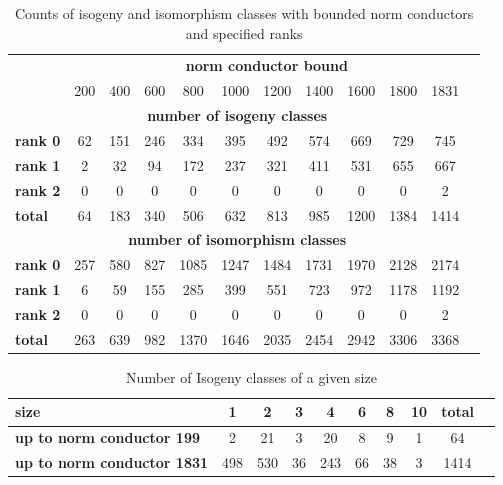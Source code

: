 \documentclass{amsart}
\begin{document}
\begin{center}
\begin{table}[h]
\caption{Counts of isogeny and isomorphism classes with bounded norm conductors and specified ranks\label{table:increasing-counts}}
\begin{tabular}{l|c|c|c|c|c|c|c|c|c|c|c|} \cline{2-11}
&\multicolumn{10}{|c|}{\textbf{norm conductor bound}} \\\cline{2-11}
& 200 & 400 & 600 & 800 & 1000 & 1200 & 1400 & 1600 & 1800 & 1831\\\hline\hline
\multicolumn{11}{|c|}{\textbf{number of isogeny classes }} \\\hline
\multicolumn{1}{|l|}{\textbf{rank 0}} & 62 & 151 & 246 & 334 & 395 & 492 & 574 & 669 & 729 & 745 \\\hline
\multicolumn{1}{|l|}{\textbf{rank 1}} & 2 & 32 & 94 & 172 & 237 & 321 & 411 & 531 & 655 & 667 \\\hline
\multicolumn{1}{|l|}{\textbf{rank 2}} & 0 & 0 & 0 & 0 & 0 & 0 & 0 & 0 & 0 & 2 \\\hline
\multicolumn{1}{|l|}{\textbf{total}} & 64 & 183 & 340 & 506 & 632 & 813 & 985 & 1200 & 1384 & 1414 \\\hline\hline
\multicolumn{11}{|c|}{\textbf{number of isomorphism classes}} \\\hline
\multicolumn{1}{|l|}{\textbf{rank 0}} & 257 & 580 & 827 & 1085 & 1247 & 1484 & 1731 & 1970 & 2128 & 2174 \\\hline
\multicolumn{1}{|l|}{\textbf{rank 1}} & 6 & 59 & 155 & 285 & 399 & 551 & 723 & 972 & 1178 & 1192 \\\hline
\multicolumn{1}{|l|}{\textbf{rank 2}} & 0 & 0 & 0 & 0 & 0 & 0 & 0 & 0 & 0 & 2 \\\hline
\multicolumn{1}{|l|}{\textbf{total}} & 263 & 639 & 982 & 1370 & 1646 & 2035 & 2454 & 2942 & 3306 & 3368 \\\hline
\end{tabular}
\end{table}
\end{center}

\begin{center}
\begin{table}[h]
\caption{Number of Isogeny classes of a given size\label{table:isogeny-sizes}}
\begin{tabular}{|l|c|c|c|c|c|c|c|c|c|}\hline
\textbf{size}                      & 1   & 2   & 3  & 4   & 6  & 8  & 10 & total \\\hline
\textbf{up to norm conductor 199}  & 2   & 21  & 3  & 20  & 8  & 9  & 1  & 64    \\\hline
\textbf{up to norm conductor 1831} & 498 & 530 & 36 & 243 & 66 & 38 & 3  & 1414  \\\hline
\end{tabular}
\end{table}
\end{center}
\end{document}
